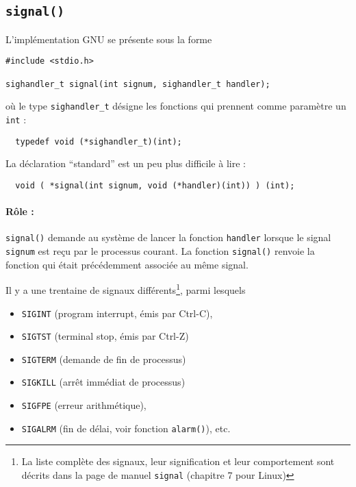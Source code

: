 
\subsection{\texttt{signal()}}

L'implémentation GNU se présente sous la forme

\extrait
\begin{lstlisting}
#include <stdio.h>

sighandler_t signal(int signum, sighandler_t handler);
\end{lstlisting}

où le type \verb+sighandler_t+ désigne les fonctions qui prennent
comme paramètre un \texttt{int} :

\begin{lstlisting}
  typedef void (*sighandler_t)(int);
\end{lstlisting}

La déclaration ``standard'' est un peu plus difficile à lire :
\begin{lstlisting}
  void ( *signal(int signum, void (*handler)(int)) ) (int);
\end{lstlisting}


\paragraph{Rôle : } \texttt{signal()} demande au système de lancer la fonction
\texttt{handler} lorsque le signal \texttt{signum} est reçu par le processus
courant.  La fonction \texttt{signal()} renvoie la fonction qui était
précédemment associée au même signal. 


Il y a une trentaine de signaux différents\footnote{La liste
complète des signaux, leur signification et leur comportement sont
décrits dans la page de manuel \texttt{signal} (chapitre 7 pour
Linux)},
parmi lesquels
\begin{itemize}
\item  \texttt{SIGINT} (program interrupt, émis par Ctrl-C), 
\item  \texttt{SIGTST} (terminal stop, émis par Ctrl-Z)
\item  \texttt{SIGTERM} (demande de fin de processus)
\item  \texttt{SIGKILL} (arrêt immédiat de processus)
\item  \texttt{SIGFPE} (erreur arithmétique),
\item  \texttt{SIGALRM} (fin de délai, voir fonction \texttt{alarm()}), etc.
\end{itemize}

